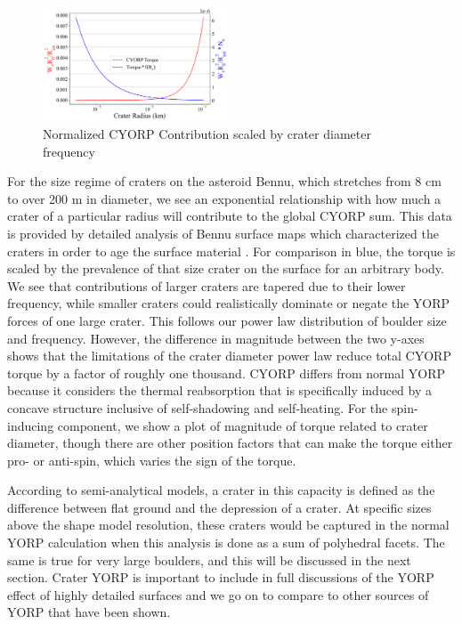 \begin{figure}[H]
    \centering
    \includegraphics[width = 0.49\textwidth]{fig/cyorp.png}
    \caption{Normalized CYORP Contribution scaled by crater diameter frequency}
    \label{fig:three graphs}
\end{figure}

For the size regime of craters on the asteroid Bennu, which stretches from 8 cm to over 200 m in diameter, we see an exponential relationship with how much a crater of a particular radius will contribute to the global CYORP sum. This data is provided by detailed analysis of Bennu surface maps which characterized the craters in order to age the surface material \cite{Bierhaus2022}. For comparison in blue, the torque is scaled by the prevalence of that size crater on the surface for an arbitrary body. We see that contributions of larger craters are tapered due to their lower frequency, while smaller craters could realistically dominate or negate the YORP forces of one large crater. This follows our power law distribution of boulder size and frequency. However, the difference in magnitude between the two y-axes shows that the limitations of the crater diameter power law reduce total CYORP torque by a factor of roughly one thousand. CYORP differs from normal YORP because it considers the thermal reabsorption that is specifically induced by a concave structure inclusive of self-shadowing and self-heating. For the spin-inducing component, we show a plot of magnitude of torque related to crater diameter, though there are other position factors that can make the torque either pro- or anti-spin, which varies the sign of the torque. 

According to semi-analytical models, a crater in this capacity is defined as the difference between flat ground and the depression of a crater. At specific sizes above the shape model resolution, these craters would be captured in the normal YORP calculation when this analysis is done as a sum of polyhedral facets. The same is true for very large boulders, and this will be discussed in the next section. Crater YORP is important to include in full discussions of the YORP effect of highly detailed surfaces and we go on to compare to other sources of YORP that have been shown.

